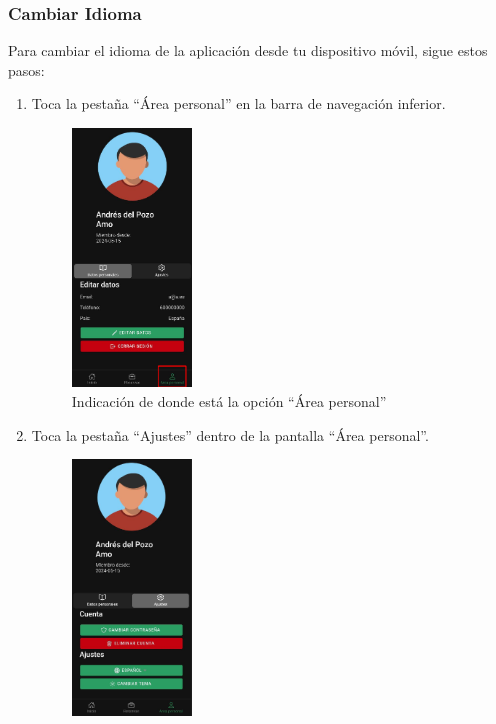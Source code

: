 \subsubsection{Cambiar Idioma}
Para cambiar el idioma de la aplicación desde tu dispositivo móvil, sigue estos pasos:
\begin{enumerate}
	\item Toca la pestaña “Área personal” en la barra de navegación inferior.
	      \begin{figure}[H]
		      \centering
		      \includegraphics[width=0.3\textwidth]{7-Construccion/Manuales/app/P1-Perfil.png}
		      \caption{Indicación de donde está la opción “Área personal” }
	      \end{figure}
	\item Toca la pestaña “Ajustes” dentro de la pantalla “Área personal”.
	      \begin{figure}[H]
		      \centering
		      \includegraphics[width=0.3\textwidth]{7-Construccion/Manuales/app/P4-Perfil.png}

\end{figure}
\end{enumerate}
